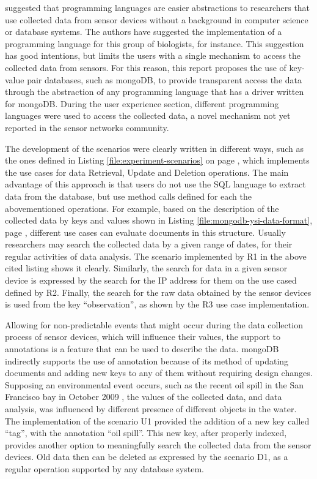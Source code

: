 \cite{sn-programming-language} suggested that programming languages are easier
abstractions to researchers that use collected data from sensor devices
without a background in computer science or database systems. The authors have
suggested the implementation of a programming language for this group of
biologists, for instance. This suggestion has good intentions, but
limits the users with a single mechanism to access the collected data from
sensors. For this reason, this report proposes the use of key-value pair
databases, such as mongoDB, to provide transparent access the data through
the abstraction of any programming language that has a driver written for
mongoDB. During the user experience section, different programming languages
were used to access the collected data, a novel mechanism not yet reported in
the sensor networks community.

The development of the scenarios were clearly written in different ways, such
as the ones defined in Listing \ref{file:experiment-scenarios} on page
\pageref{file:experiment-scenarios}, which implements the use cases for data
Retrieval, Update and Deletion operations. The main advantage of this approach
is that users do not use the SQL language to extract data from the database,
but use method calls defined for each the abovementioned operations. For
example, based on the description of the collected data by keys and values
shown in Listing \ref{file:mongodb-ysi-data-format}, page
\pageref{file:mongodb-ysi-data-format}, different use cases can evaluate
documents in this structure. Usually researchers may search the collected data
by a given range of dates, for their regular activities of data analysis. The
scenario implemented by R1 in the above cited listing shows it clearly.
Similarly, the search for data in a given sensor device is expressed by the
search for the IP address for them on the use cased defined by R2. Finally,
the search for the raw data obtained by the sensor devices is used from the
key ``observation'', as shown by the R3 use case implementation.

Allowing for non-predictable events that might occur during the data
collection process of sensor devices, which will influence their values, the
support to annotations is a feature that can be used to describe the data.
mongoDB indirectly supports the use of annotation because of its method
of updating documents and adding new keys to any of them without requiring
design changes. Supposing an environmental event occurs, such as the recent oil
spill in the San Francisco bay in October 2009 \cite{sfbay-oilspill2009}, the
values of the collected data, and data analysis, was influenced by different
presence of different objects in the water. The implementation of the scenario
U1 provided the addition of a new key called ``tag'', with the annotation ``oil
spill''. This new key, after properly indexed, provides another option to
meaningfully search the collected data from the sensor devices. Old data then
can be deleted as expressed by the scenario D1, as a regular operation
supported by any database system.

